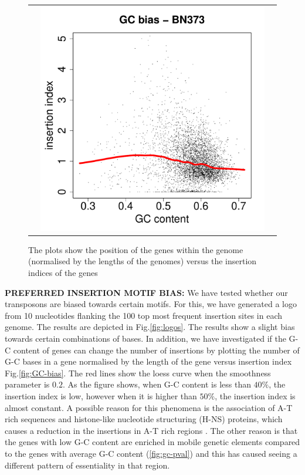 \documentclass[12pt,letterpaper]{article}
\begin{document}
\begin{figure}
\begin{tabular}{c c c}
&\includegraphics[page=38, scale=0.25]{biases.pdf}&\\
\end{tabular}
\caption{The plots show the position of the genes within the genome (normalised by the lengths of the genomes) versus the insertion indices of the genes}
\label{fig:distance-bias}
\end{figure}

{\bf PREFERRED INSERTION MOTIF BIAS:} We have tested whether our transposons are biased towards certain motifs. For this, we have generated a logo from 10 nucleotides flanking the 100 top most frequent insertion sites in each genome. The results are depicted in Fig.\@  \ref{fig:logos}. The results show a slight bias towards certain combinations of bases. In addition, we have investigated if the G-C content of genes can change the number of insertions by plotting the number of G-C bases in a gene normalised by the length of the gene versus insertion index Fig.\@  \ref{fig:GC-bias}. The red lines show the loess curve when the smoothness parameter is $0.2$. As the figure shows, when G-C content is less than $40\%$, the insertion index is low, however when it is higher than $50\%$, the insertion index is almost constant. A possible reason for this phenomena is the association of A-T rich sequences and histone-like nucleotide structuring (H-NS) proteins, which causes a reduction in the insertions in A-T rich regions \cite{kimura_nucleoid_2016}. The other reason is that the genes with low G-C content are enriched in mobile genetic elements compared to the genes with average G-C content (\ref{fig:gc-pval}) and this has caused seeing a different pattern of essentiality in that region.
\end{document}
